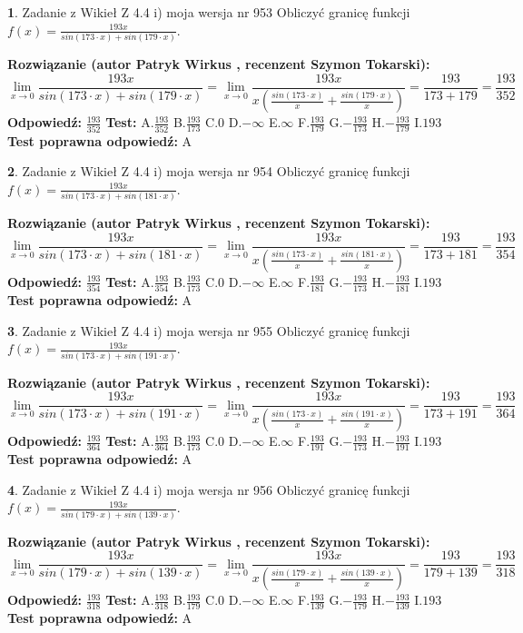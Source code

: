 \documentclass[12pt, a4paper]{article}
\theoremstyle{definition} %
\newtheorem{zad}{}
\newcommand{\zadStart}[1]{\begin{zad}#1\newline}
\newcommand{\zadStop}{\end{zad}}
\newcommand{\rozwStart}[2]{\noindent \textbf{Rozwiązanie (autor #1 , recenzent #2): }\newline}
\newcommand{\rozwStop}{\newline}
\newcommand{\odpStart}{\noindent \textbf{Odpowiedź:}\newline}
\newcommand{\odpStop}{\newline}
\newcommand{\testStart}{\noindent \textbf{Test:}\newline}
\newcommand{\testStop}{\newline}
\newcommand{\kluczStart}{\noindent \textbf{Test poprawna odpowiedź:}\newline}
\newcommand{\kluczStop}{\newline}
\begin{document}
\zadStart{Zadanie z Wikieł Z 4.4 i) moja wersja nr 953}
Obliczyć granicę funkcji $f(x)=\frac{193x}{sin(173\cdot x) +sin(179\cdot x)}$.
\zadStop
\rozwStart{Patryk Wirkus}{Szymon Tokarski}
$$\lim\limits_{x\to 0}\frac{193x}{sin(173\cdot x) +sin(179\cdot x)}=\lim\limits_{x\to 0}\frac{193x}{x(\frac{sin(173\cdot x)}{x}+\frac{sin(179\cdot x)}{x})}=\frac{193}{173+179} = \frac{193}{352}$$
\rozwStop
\odpStart
$\frac{193}{352}$
\odpStop
\testStart
A.$\frac{193}{352}$
B.$\frac{193}{173}$
C.$0$
D.$-\infty$
E.$\infty$
F.$\frac{193}{179}$
G.$-\frac{193}{173}$
H.$-\frac{193}{179}$
I.$193$
\testStop
\kluczStart
A
\kluczStop



\zadStart{Zadanie z Wikieł Z 4.4 i) moja wersja nr 954}
Obliczyć granicę funkcji $f(x)=\frac{193x}{sin(173\cdot x) +sin(181\cdot x)}$.
\zadStop
\rozwStart{Patryk Wirkus}{Szymon Tokarski}
$$\lim\limits_{x\to 0}\frac{193x}{sin(173\cdot x) +sin(181\cdot x)}=\lim\limits_{x\to 0}\frac{193x}{x(\frac{sin(173\cdot x)}{x}+\frac{sin(181\cdot x)}{x})}=\frac{193}{173+181} = \frac{193}{354}$$
\rozwStop
\odpStart
$\frac{193}{354}$
\odpStop
\testStart
A.$\frac{193}{354}$
B.$\frac{193}{173}$
C.$0$
D.$-\infty$
E.$\infty$
F.$\frac{193}{181}$
G.$-\frac{193}{173}$
H.$-\frac{193}{181}$
I.$193$
\testStop
\kluczStart
A
\kluczStop



\zadStart{Zadanie z Wikieł Z 4.4 i) moja wersja nr 955}
Obliczyć granicę funkcji $f(x)=\frac{193x}{sin(173\cdot x) +sin(191\cdot x)}$.
\zadStop
\rozwStart{Patryk Wirkus}{Szymon Tokarski}
$$\lim\limits_{x\to 0}\frac{193x}{sin(173\cdot x) +sin(191\cdot x)}=\lim\limits_{x\to 0}\frac{193x}{x(\frac{sin(173\cdot x)}{x}+\frac{sin(191\cdot x)}{x})}=\frac{193}{173+191} = \frac{193}{364}$$
\rozwStop
\odpStart
$\frac{193}{364}$
\odpStop
\testStart
A.$\frac{193}{364}$
B.$\frac{193}{173}$
C.$0$
D.$-\infty$
E.$\infty$
F.$\frac{193}{191}$
G.$-\frac{193}{173}$
H.$-\frac{193}{191}$
I.$193$
\testStop
\kluczStart
A
\kluczStop



\zadStart{Zadanie z Wikieł Z 4.4 i) moja wersja nr 956}
Obliczyć granicę funkcji $f(x)=\frac{193x}{sin(179\cdot x) +sin(139\cdot x)}$.
\zadStop
\rozwStart{Patryk Wirkus}{Szymon Tokarski}
$$\lim\limits_{x\to 0}\frac{193x}{sin(179\cdot x) +sin(139\cdot x)}=\lim\limits_{x\to 0}\frac{193x}{x(\frac{sin(179\cdot x)}{x}+\frac{sin(139\cdot x)}{x})}=\frac{193}{179+139} = \frac{193}{318}$$
\rozwStop
\odpStart
$\frac{193}{318}$
\odpStop
\testStart
A.$\frac{193}{318}$
B.$\frac{193}{179}$
C.$0$
D.$-\infty$
E.$\infty$
F.$\frac{193}{139}$
G.$-\frac{193}{179}$
H.$-\frac{193}{139}$
I.$193$
\testStop
\kluczStart
A
\kluczStop
\end{document}
